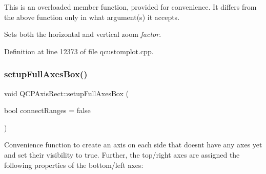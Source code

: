 This is an overloaded member function, provided for convenience. It differs from the above function only in what argument(s) it accepts.

Sets both the horizontal and vertical zoom {\itshape factor}. 

Definition at line 12373 of file qcustomplot.\+cpp.

\mbox{\label{class_q_c_p_axis_rect_a5fa906175447b14206954f77fc7f1ef4}} 
\subsubsection{\texorpdfstring{setup\+Full\+Axes\+Box()}{setupFullAxesBox()}}
{\footnotesize\ttfamily void Q\+C\+P\+Axis\+Rect\+::setup\+Full\+Axes\+Box (\begin{DoxyParamCaption}\item[{bool}]{connect\+Ranges = {\ttfamily false} }\end{DoxyParamCaption})}

Convenience function to create an axis on each side that doesn\textquotesingle{}t have any axes yet and set their visibility to true. Further, the top/right axes are assigned the following properties of the bottom/left axes\+:

